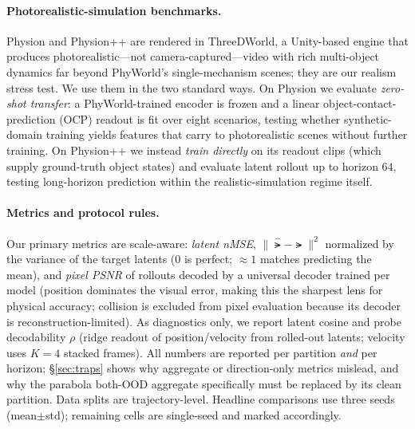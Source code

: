 \paragraph{Photorealistic-simulation benchmarks.}
Physion \citep{bear2021physion} and Physion++ \citep{tung2023physionpp} are rendered in ThreeDWorld, a Unity-based engine that produces photorealistic---not camera-captured---video with rich multi-object dynamics far beyond PhyWorld's single-mechanism scenes; they are our realism stress test. We use them in the two standard ways. On Physion we evaluate \emph{zero-shot transfer}: a PhyWorld-trained encoder is frozen and a linear object-contact-prediction (OCP) readout is fit over eight scenarios, testing whether synthetic-domain training yields features that carry to photorealistic scenes without further training. On Physion++ we instead \emph{train directly} on its readout clips (which supply ground-truth object states) and evaluate latent rollout up to horizon $64$, testing long-horizon prediction within the realistic-simulation regime itself.

\paragraph{Metrics and protocol rules.}
Our primary metrics are scale-aware: \emph{latent nMSE}, $\|\hat{\lat}-\lat\|^2$ normalized by the variance of the target latents ($0$ is perfect; ${\approx}1$ matches predicting the mean), and \emph{pixel PSNR} of rollouts decoded by a universal decoder trained per model (position dominates the visual error, making this the sharpest lens for physical accuracy; collision is excluded from pixel evaluation because its decoder is reconstruction-limited). As diagnostics only, we report latent cosine and probe decodability $\rho$ (ridge readout of position/velocity from rolled-out latents; velocity uses $K{=}4$ stacked frames). All numbers are reported per partition \emph{and} per horizon; \S\ref{sec:traps} shows why aggregate or direction-only metrics mislead, and why the parabola both-OOD aggregate specifically must be replaced by its clean \rmood{} partition. Data splits are trajectory-level. Headline comparisons use three seeds (mean$\pm$std); remaining cells are single-seed and marked accordingly.
